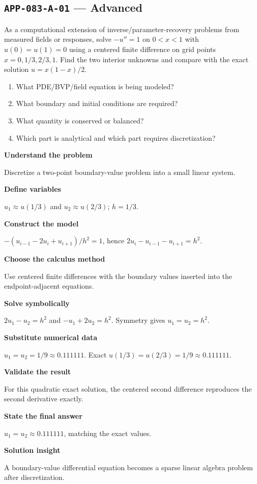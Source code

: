 \documentclass[11pt]{book}
\newcommand{\pid}[1]{\texttt{#1}}
\begin{document}
\subsection*{\pid{APP-083-A-01} — Advanced}
\begin{problembox}
As a computational extension of inverse/parameter-recovery problems from measured fields or responses, solve $-u''=1$ on $0<x<1$ with $u(0)=u(1)=0$ using a centered finite difference on grid points $x=0,1/3,2/3,1$. Find the two interior unknowns and compare with the exact solution $u=x(1-x)/2$.
\end{problembox}
\begin{promptbox}\begin{enumerate}
\item What PDE/BVP/field equation is being modeled?
\item What boundary and initial conditions are required?
\item What quantity is conserved or balanced?
\item Which part is analytical and which part requires discretization?
\end{enumerate}\end{promptbox}
\begin{solutionbox}
\textbf{Understand the problem}\par Discretize a two-point boundary-value problem into a small linear system.\par\medskip
\textbf{Define variables}\par $u_1\approx u(1/3)$ and $u_2\approx u(2/3)$; $h=1/3$.\par\medskip
\textbf{Construct the model}\par $-(u_{i-1}-2u_i+u_{i+1})/h^2=1$, hence $2u_i-u_{i-1}-u_{i+1}=h^2$.\par\medskip
\textbf{Choose the calculus method}\par Use centered finite differences with the boundary values inserted into the endpoint-adjacent equations.\par\medskip
\textbf{Solve symbolically}\par $2u_1-u_2=h^2$ and $-u_1+2u_2=h^2$. Symmetry gives $u_1=u_2=h^2$.\par\medskip
\textbf{Substitute numerical data}\par $u_1=u_2=1/9\approx 0.111111$. Exact $u(1/3)=u(2/3)=1/9\approx 0.111111$.\par\medskip
\textbf{Validate the result}\par For this quadratic exact solution, the centered second difference reproduces the second derivative exactly.\par\medskip
\textbf{State the final answer}\par $u_1=u_2\approx 0.111111$, matching the exact values.\par\medskip
\textbf{Solution insight}\par A boundary-value differential equation becomes a sparse linear algebra problem after discretization.\par\medskip
\end{solutionbox}
\end{document}

